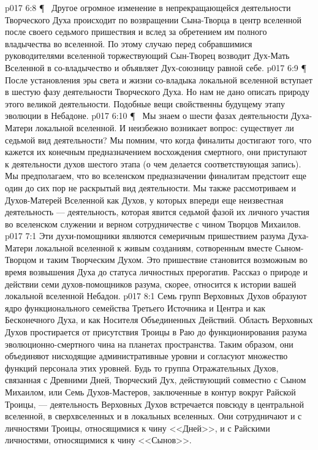 \vs p017 6:8 \P\ \bibnobreakspace {} Другое огромное изменение в непрекращающейся деятельности Творческого Духа происходит по возвращении Сына\hyp{}Творца в центр вселенной после своего седьмого пришествия и вслед за обретением им полного владычества во вселенной. По этому случаю перед собравшимися руководителями вселенной торжествующий Сын\hyp{}Творец возводит Дух\hyp{}Мать Вселенной в со\hyp{}владычество и объявляет Дух\hyp{}союзницу равной себе.
\vs p017 6:9 \P\ \bibnobreakspace {} После установления эры света и жизни со\hyp{}владыка локальной вселенной вступает в шестую фазу деятельности Творческого Духа. Но нам не дано описать природу этого великой деятельности. Подобные вещи свойственны будущему этапу эволюции в Небадоне.
\vs p017 6:10 \P\ \bibnobreakspace {} Мы знаем о шести фазах деятельности Духа\hyp{}Матери локальной вселенной. И неизбежно возникает вопрос: существует ли седьмой вид деятельности? Мы помним, что когда финалиты достигают того, что кажется их конечным предназначением восхождения смертного, они приступают к деятельности духов шестого этапа (о чем делается соответствующая запись). Мы предполагаем, что во вселенском предназначении финалитам предстоит еще один до сих пор не раскрытый вид деятельности. Мы также рассмотриваем и Духов\hyp{}Матерей Вселенной как Духов, у которых впереди еще неизвестная деятельность --- деятельность, которая явится седьмой фазой их личного участия во вселенском служении и верном сотрудничестве с чином Творцов Михаилов.
\vs p017 7:1 Эти духи\hyp{}помощники являются семеричным пришествием разума Духа\hyp{}Матери локальной вселенной к живым созданиям, сотворенным вместе Сыном\hyp{}Творцом и таким Творческим Духом. Это пришествие становится возможным во время возвышения Духа до статуса личностных прерогатив. Рассказ о природе и действии семи духов\hyp{}помощников разума, скорее, относится к истории вашей локальной вселенной Небадон.
\vs p017 8:1 Семь групп Верховных Духов образуют ядро функционального семейства Третьего Источника и Центра и как Бесконечного Духа, и как Носителя Объединенных Действий. Область Верховных Духов простирается от присутствия Троицы в Раю до функционирования разума эволюционно\hyp{}смертного чина на планетах пространства. Таким образом, они объединяют нисходящие административные уровни и согласуют множество функций персонала этих уровней. Будь то группа Отражательных Духов, связанная с Древними Дней, Творческий Дух, действующий совместно с Сыном Михаилом, или Семь Духов\hyp{}Мастеров, заключенные в контур вокруг Райской Троицы, --- деятельность Верховных Духов встречается повсюду в центральной вселенной, в сверхвселенных и в локальных вселенных. Они сотрудничают и с личностями Троицы, относящимися к чину <<Дней>>, и с Райскими личностями, относящимися к чину <<Сынов>>.
